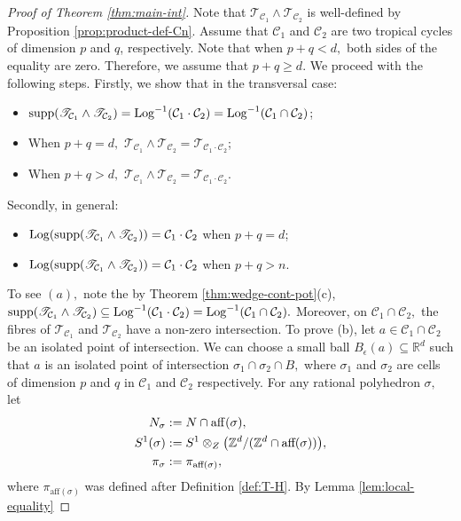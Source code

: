 \documentclass[11pt]{amsart}
\def\Log{{\rm Log}}
\def\aff{{\rm aff}}
\theoremstyle{definition}
\newcommand{\R}{\mathbb{R}}
\newcommand{\Z}{\mathbb{Z}}
\newcommand{\cC}{\mathcal{C}}
\newcommand{\sT}{\mathscr{T}}
\newcommand{\supp}[1]{{\mathrm{supp}(#1)}}
\begin{document}
\begin{proof}[Proof of Theorem \ref{thm:main-int}]
Note that $\sT_{\cC_1}\wedge \sT_{\cC_2}$ is well-defined by Proposition \ref{prop:product-def-Cn}. Assume that $\cC_1$ and $\cC_2$ are two tropical cycles of dimension $p$ and $q$, respectively. Note that when $p+q < d,$ both sides of the equality are zero. Therefore, we assume that $p+q \geq d.$ We proceed with the following steps. Firstly, we show that in the transversal case:
\begin{itemize}
    \item [(a)] $\supp{\sT_{\cC_1} \wedge \sT_{\cC_2}} = \Log^{-1}(\cC_1 \cdot \cC_2) = \Log^{-1}(\cC_1 \cap \cC_2)$;
    \item [(b)] When $p+q= d,$ $\sT_{\cC_1}\wedge \sT_{\cC_2} = \sT_{\cC_1 \cdot \cC_2}$; 
    \item [(c)] When $p+q >d,$ $\sT_{\cC_1}\wedge \sT_{\cC_2} = \sT_{\cC_1 \cdot \cC_2}$. 
\end{itemize}
Secondly, in general:
\begin{itemize}
    \item [(d)] $\Log(\supp{\sT_{\cC_1} \wedge \sT_{\cC_2}}) = \cC_1 \cdot \cC_2$ when $p+q=d$;
    \item [(e)]  $\Log(\supp{\sT_{\cC_1} \wedge \sT_{\cC_2}}) = \cC_1 \cdot \cC_2$ when $p+q >n$.
\end{itemize}
To see $(a),$ note the by Theorem \ref{thm:wedge-cont-pot}(c), $\supp{\sT_{\cC_1} \wedge \sT_{\cC_2}} \subseteq \Log^{-1}(\cC_1 \cdot \cC_2) = \Log^{-1}(\cC_1 \cap \cC_2).$ Moreover, on $\cC_1 \cap \cC_2,$ the fibres of $\sT_{\cC_1}$ and $\sT_{\cC_2}$ have a non-zero intersection. 
\vskip 2mm
\noindent
To prove (b), let $a \in \cC_1 \cap \cC_2$ be an isolated point of intersection. We can choose a small ball $B_{\epsilon}(a) \subseteq \R^d$ such that $a$ is an isolated point of intersection $\sigma_1 \cap \sigma_2 \cap B,$ where $\sigma_1$ and $\sigma_2$ are cells of dimension $p$ and $q$ in $\cC_1$ and $\cC_2$ respectively. For any rational polyhedron $\sigma,$ let
\begin{align*}
    N_{\sigma}&:= N \cap \aff(\sigma),\\
    S^1(\sigma)&:= S^1 \otimes_Z \big(\Z^d /(\Z^d \cap \textrm{aff}(\sigma))\big), \\
    \pi_{\sigma}&:= \pi_{\textrm{aff}(\sigma)},
\end{align*}
 where $\pi_{\textrm{aff}(\sigma)}$ was defined after Definition \ref{def:T-H}. By Lemma \ref{lem:local-equality}

\end{proof}
\end{document}

